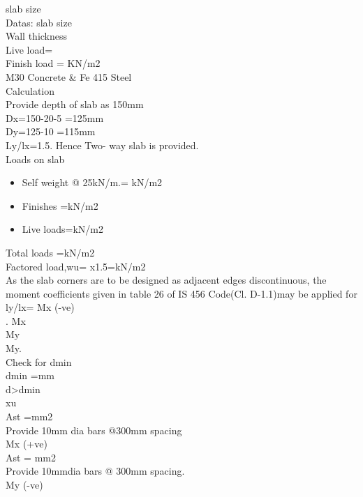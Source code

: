 slab size \\
Datas:      slab size \\
Wall thickness \\
Live load= \\
Finish load = KN/m2\\
M30 Concrete \&  Fe 415 Steel\\
Calculation\\
Provide depth of slab as 150mm\\
Dx=150-20-5 =125mm\\
Dy=125-10    =115mm\\
Ly/lx=1.5. Hence Two- way slab is provided.\\
Loads on slab\\
\begin{itemize}
	\item Self  weight @ 25kN/m.= kN/m2
	\item Finishes    =kN/m2
	\item	Live loads=kN/m2
\end{itemize}
Total loads     =kN/m2\\
Factored load,wu= x1.5=kN/m2\\
As the slab corners are to be designed as adjacent edges discontinuous, the moment coefficients given in table 26 of IS 456 Code(Cl. D-1.1)may be applied for ly/lx=
Mx (-ve)\\.
Mx \\
My \\
My.\\
Check for dmin\\

dmin                 =mm\\
d>dmin\\
xu\\		

Ast		=mm2\\
Provide 10mm dia bars @300mm spacing\\
Mx (+ve)	\\

Ast 		= mm2\\
Provide 10mmdia bars @ 300mm spacing.\\
My (-ve)\\

